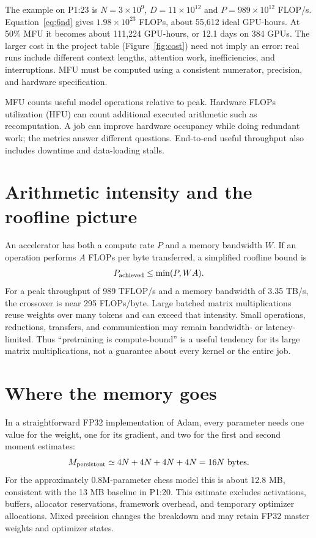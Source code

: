 The example on P1:23 is $N=3\times10^9$, $D=11\times10^{12}$ and $P=989\times10^{12}$ FLOP/s. Equation~\eqref{eq:6nd} gives $1.98\times10^{23}$ FLOPs, about 55,612 ideal GPU-hours. At 50\% MFU it becomes about 111,224 GPU-hours, or 12.1 days on 384 GPUs. The larger cost in the project table (Figure~\ref{fig:cost}) need not imply an error: real runs include different context lengths, attention work, inefficiencies, and interruptions. MFU must be computed using a consistent numerator, precision, and hardware specification.

MFU counts useful model operations relative to peak. Hardware FLOPs utilization (HFU) can count additional executed arithmetic such as recomputation. A job can improve hardware occupancy while doing redundant work; the metrics answer different questions. End-to-end useful throughput also includes downtime and data-loading stalls.

\section{Arithmetic intensity and the roofline picture}
An accelerator has both a compute rate $P$ and a memory bandwidth $W$. If an operation performs $A$ FLOPs per byte transferred, a simplified roofline bound is
\begin{equation}
 P_{\rm achieved}\leq\min(P,WA).
\end{equation}
For a peak throughput of 989 TFLOP/s and a memory bandwidth of 3.35 TB/s, the crossover is near 295 FLOPs/byte. Large batched matrix multiplications reuse weights over many tokens and can exceed that intensity. Small operations, reductions, transfers, and communication may remain bandwidth- or latency-limited. Thus ``pretraining is compute-bound'' is a useful tendency for its large matrix multiplications, not a guarantee about every kernel or the entire job.

\section{Where the memory goes}
In a straightforward FP32 implementation of Adam, every parameter needs one value for the weight, one for its gradient, and two for the first and second moment estimates:
\begin{equation}
 M_{\rm persistent}\simeq4N+4N+4N+4N=16N\ \text{bytes}.
\end{equation}
For the approximately 0.8M-parameter chess model this is about 12.8 MB, consistent with the 13 MB baseline in P1:20. This estimate excludes activations, buffers, allocator reservations, framework overhead, and temporary optimizer allocations. Mixed precision changes the breakdown and may retain FP32 master weights and optimizer states.

